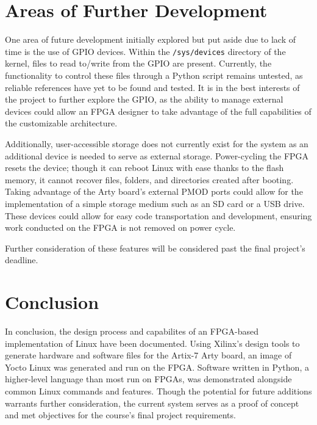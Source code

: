 \documentclass{article}
\begin{document}
\section{Areas of Further Development}
One area of future development initially explored but put aside due to lack of time is the use of GPIO devices. Within the \texttt{/sys/devices} directory of the kernel, files to read to/write from the GPIO are present. Currently, the functionality to control these files through a Python script remains untested, as reliable references have yet to be found and tested. It is in the best interests of the project to further explore the GPIO, as the ability to manage external devices could allow an FPGA designer to take advantage of the full capabilities of the customizable architecture.\par
Additionally, user-accessible storage does not currently exist for the system as an additional device is needed to serve as external storage. Power-cycling the FPGA resets the device; though it can reboot Linux with ease thanks to the flash memory, it cannot recover files, folders, and directories created after booting. Taking advantage of the Arty board's external PMOD ports \cite{pmods} could allow for the implementation of a simple storage medium such as an SD card or a USB drive. These devices could allow for easy code transportation and development, ensuring work conducted on the FPGA is not removed on power cycle.\par
Further consideration of these features will be considered past the final project's deadline.\par
 
\section{Conclusion}
In conclusion, the design process and capabilites of an FPGA-based implementation of Linux have been documented. Using Xilinx's design tools to generate hardware and software files for the Artix-7 Arty board, an image of Yocto Linux was generated and run on the FPGA. Software written in Python, a higher-level language than most run on FPGAs, was demonstrated alongside common Linux commands and features. Though the potential for future additions warrants further consideration, the current system serves as a proof of concept and met objectives for the course's final project requirements.\par




\end{document}
